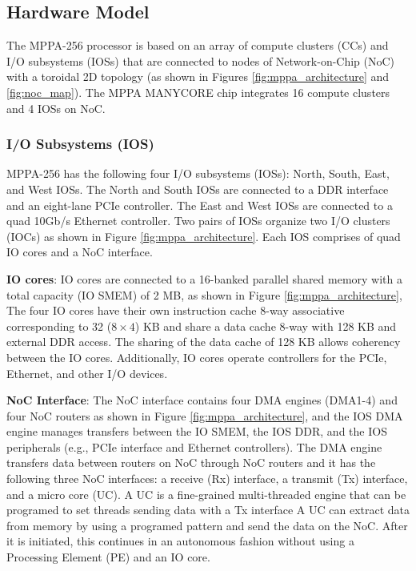 \documentclass[conference,compsoc]{IEEEtran}
\newcommand{\comment}[1]{}
\begin{document}
\vspace{-3mm}
\subsection{Hardware Model}
\label{sec:hardware_model}
\vspace{-3mm}
The MPPA-256 processor is based on an array of compute clusters (CCs) and I/O subsystems (IOSs) that are connected to nodes of Network-on-Chip (NoC) with a toroidal 2D topology 
(as shown in Figures \ref{fig:mppa_architecture} and \ref{fig:noc_map}).
The MPPA MANYCORE chip integrates 16 compute clusters and 4 IOSs on NoC.

\vspace{-2mm}
\subsubsection{I/O Subsystems (IOS)}
\label{sec:ios}
MPPA-256 has the following four I/O subsystems (IOSs): North, South, East, and West IOSs.
The North and South IOSs are connected to a DDR interface and an eight-lane PCIe controller.
The East and West IOSs are connected to a quad 10Gb/s Ethernet controller.
Two pairs of IOSs organize two I/O clusters (IOCs) as shown in Figure \ref{fig:mppa_architecture}.
Each IOS comprises of quad IO cores and a NoC interface.

\textbf{IO cores}: IO cores are connected to a 16-banked parallel shared memory with a total capacity (IO SMEM) of 2 MB, as shown in Figure \ref{fig:mppa_architecture},
The four IO cores have their own instruction cache 8-way associative corresponding to 32 ($8 \times 4$) KB and share a data cache 8-way with 128 KB and external DDR access.
The sharing of the data cache of 128 KB allows coherency between the IO cores.
Additionally, IO cores operate controllers for the PCIe, Ethernet, \comment{1-11} and other I/O devices.

\textbf{NoC Interface}: The NoC interface contains four DMA engines (DMA1-4) and four NoC routers as shown in Figure \ref{fig:mppa_architecture}, and the IOS DMA engine manages transfers between the IO SMEM, the IOS DDR, and the IOS peripherals (e.g., PCIe interface and Ethernet controllers).
The DMA engine transfers data between routers on NoC through NoC routers and it has the following three NoC interfaces: a receive (Rx) interface, a transmit (Tx) interface, and a micro core (UC).
A UC is a fine-grained multi-threaded engine that can be programed to set threads sending data with a Tx interface
A UC can extract data from memory by using a programed pattern and send the data on the NoC.
After it is initiated, this continues in an autonomous fashion without using a Processing Element (PE) and an IO core.
\end{document}
